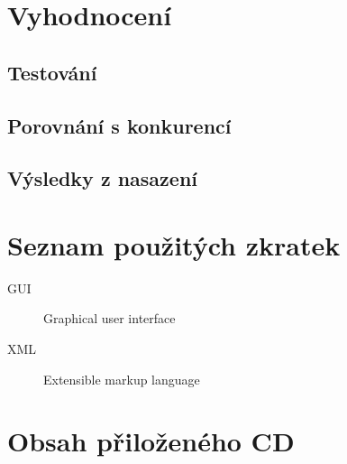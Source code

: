 \documentclass[thesis=B,czech,hidelinks]{FITthesis}[2019/03/06]
\begin{document}
\chapter{Vyhodnocení}
\section{Testování}
\section{Porovnání s konkurencí}
\section{Výsledky z nasazení}

\begin{conclusion}
\end{conclusion}

\printbibliography{}

\appendix

\chapter{Seznam použitých zkratek}
\begin{description}
    \item[GUI] Graphical user interface
    \item[XML] Extensible markup language
\end{description}

\chapter{Obsah přiloženého CD}

\end{document}
